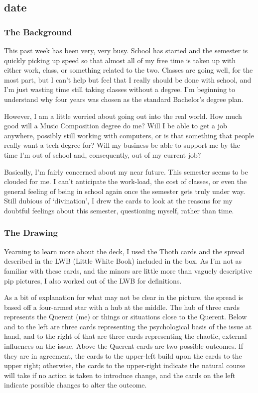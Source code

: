 \subsection{date}
\subsubsection*{The Background}
This past week has been very, very busy.  School has started and the
semester is quickly picking up speed so that almost all of my free time
is taken up with either work, class, or something related to the two.
Classes are going well, for the most part, but I can't help but feel
that I really should be done with school, and I'm just wasting time
still taking classes without a degree.  I'm beginning to understand why
four years was chosen as the standard Bachelor's degree plan.

However, I am a little worried about going out into the real world.  How
much good will a Music Composition degree do me?  Will I be able to get
a job anywhere, possibly still working with computers, or is that
something that people really want a tech degree for?  Will my business
be able to support me by the time I'm out of school and, consequently,
out of my current job?

Basically, I'm fairly concerned about my near future.  This semester
seems to be clouded for me.  I can't anticipate the work-load, the cost
of classes, or even the general feeling of being in school again once
the semester gets truly under way.  Still dubious of `divination', I
drew the cards to look at the reasons for my doubtful feelings about
this semester, questioning myself, rather than time.

\subsubsection*{The Drawing}
Yearning to learn more about the deck, I used the Thoth\cite{tarotThoth}
cards and the spread described in the LWB (Little White Book) included
in the box.  As I'm not as familiar with these cards, and the minors are
little more than vaguely descriptive pip pictures, I also worked out of
the LWB for definitions.

As a bit of explanation for what may not be clear in the picture, the
spread is based off a four-armed star with a hub at the middle.  The hub
of three cards represents the Querent (me) or things or situations
close to the Querent.  Below and to the left are three cards
representing the psychological basis of the issue at hand, and to the
right of that are three cards representing the chaotic, external
influences on the issue.  Above the Querent cards are two possible
outcomes.  If they are in agreement, the cards to the upper-left build
upon the cards to the upper right; otherwise, the cards to the
upper-right indicate the natural course will take if no action is taken
to introduce change, and the cards on the left indicate possible changes
to alter the outcome. 

